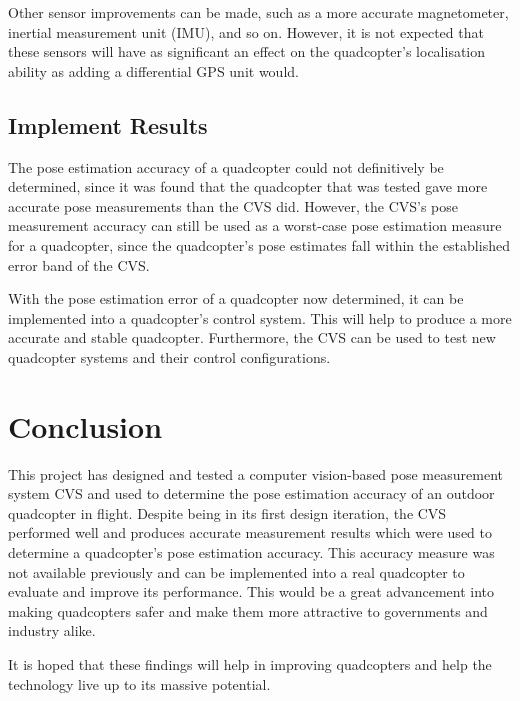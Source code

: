 Other sensor improvements can be made, such as a more accurate magnetometer, inertial measurement unit (IMU), and so on. However, it is not expected that these sensors will have as significant an effect on the quadcopter's localisation ability as adding a differential GPS unit would. 

\subsection{Implement Results}

The pose estimation accuracy of a quadcopter could not definitively be determined, since it was found that the quadcopter that was tested gave more accurate pose measurements than the CVS did. However, the CVS's pose measurement accuracy can still be used as a worst-case pose estimation measure for a quadcopter, since the quadcopter's pose estimates fall within the established error band of the CVS.\@ 

With the pose estimation error of a quadcopter now determined, it can be implemented into a quadcopter's control system. This will help to produce a more accurate and stable quadcopter. Furthermore, the CVS can be used to test new quadcopter systems and their control configurations. 

\section{Conclusion}

This project has designed and tested a computer vision-based pose measurement system CVS and used to determine the pose estimation accuracy of an outdoor quadcopter in flight. Despite being in its first design iteration, the CVS performed well and produces accurate measurement results which were used to determine a quadcopter's pose estimation accuracy. This accuracy measure was not available previously and can be implemented into a real quadcopter to evaluate and improve its performance. This would be a great advancement into making quadcopters safer and make them more attractive to governments and industry alike. 


It is hoped that these findings will help in improving quadcopters and help the technology live up to its massive potential. 
